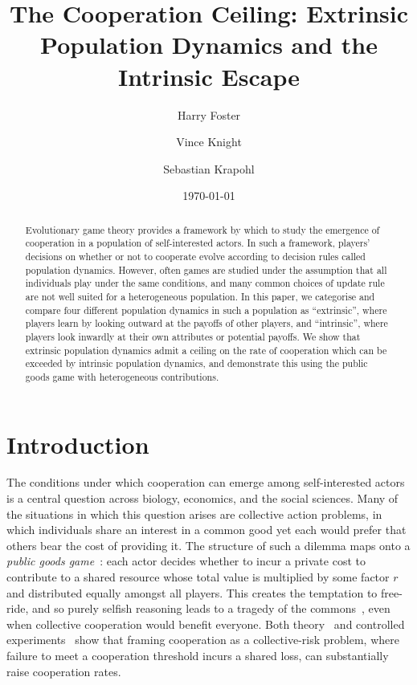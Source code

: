 \documentclass{article}
\title{The Cooperation Ceiling: Extrinsic Population Dynamics and the Intrinsic Escape}
\author[1,*]{Harry Foster}
\author[1]{Vince Knight}
\author[2]{Sebastian Krapohl}
\affil[1]{School of Computational and Mathematical Sciences, Cardiff University}
\affil[2]{Faculty of Social and Behavioural Sciences, University of Amsterdam}
\affil[*]{Corresponding author: \texttt{fosterh3@cardiff.ac.uk}}
\date{\today}
\begin{document}
\maketitle

\begin{abstract} %
    Evolutionary game theory provides a framework by which to study the
    emergence of cooperation in a population of self-interested actors. In such
    a framework, players' decisions on whether or not to cooperate evolve
    according to decision rules called population dynamics. However, often games
    are studied under the assumption that all individuals play under the same
    conditions, and many common choices of update rule are not well suited for a
    heterogeneous population. In this paper, we categorise and compare four
    different population dynamics in such a population as ``extrinsic'', where
    players learn by looking outward at the payoffs of other players, and
    ``intrinsic'', where players look inwardly at their own attributes or
    potential payoffs. We show that extrinsic population dynamics admit a
    ceiling on the rate of cooperation which can be exceeded by intrinsic
    population dynamics, and demonstrate this using the public goods game with
    heterogeneous contributions.
\end{abstract}

\section{Introduction} %

The conditions under which cooperation can emerge among self-interested actors
is a central question across biology, economics, and the social sciences. Many
of the situations in which this question arises are collective action problems,
in which individuals share an interest in a common good yet each would prefer
that others bear the cost of providing it. The structure of such a dilemma maps
onto a \emph{public goods game}~\cite{ARCHETTI20129, hauert2002volunteering,
hauser2019social, HauertDynamics2004, calc_of_selfishness}:
each actor decides whether to incur a private cost to contribute to a shared
resource whose total value is multiplied by some factor \(r\) and distributed
equally amongst all players. This creates the temptation to free-ride, and so
purely selfish reasoning leads to a tragedy of the
commons~\cite{hardin1968tragedy, Weitz043299}, even when collective cooperation
would benefit everyone. Both theory~\cite{santos2011risk} and controlled
experiments~\cite{Milinski2011,milinski2008collective} show that framing
cooperation as a collective-risk problem, where failure to meet a cooperation
threshold incurs a shared loss, can substantially raise cooperation rates.
\end{document}
